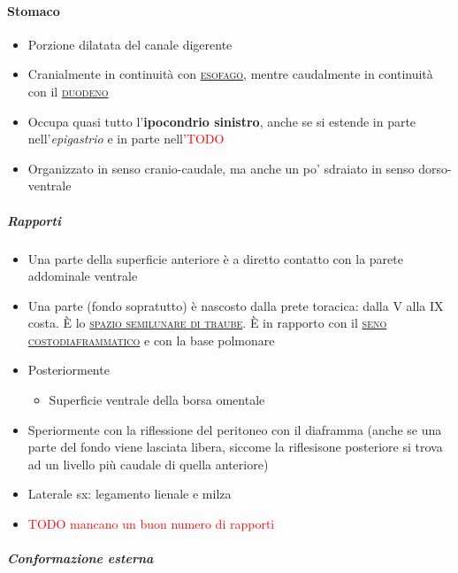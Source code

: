 \documentclass[italian,]{article}
\providecommand{\tightlist}{%
  \setlength{\itemsep}{0pt}\setlength{\parskip}{0pt}}
\renewcommand{\a}[1]{\underline{\textsc{#1}}}
\newcommand{\TODO}[1]{\textcolor{red}{\textsf{\footnotesize{TODO #1}}}} %
\begin{document}
\hypertarget{stomaco}{%
\paragraph{Stomaco}\label{stomaco}}

\begin{itemize}
\tightlist
\item
  Porzione dilatata del canale digerente
\item
  Cranialmente in continuità con \a{esofago}, mentre caudalmente in
  continuità con il \a{duodeno}
\item
  Occupa quasi tutto l'\textbf{ipocondrio sinistro}, anche se si estende
  in parte nell'\emph{epigastrio} e in parte nell'\TODO{}
\item
  Organizzato in senso cranio-caudale, ma anche un po' sdraiato in senso
  dorso-ventrale
\end{itemize}

\hypertarget{rapporti-2}{%
\subparagraph{Rapporti}\label{rapporti-2}}

\begin{itemize}
\item
  Una parte della superficie anteriore è a diretto contatto con la
  parete addominale ventrale
\item
  Una parte (fondo sopratutto) è nascosto dalla prete toracica: dalla V
  alla IX costa. È lo \a{spazio semilunare di traube}. È in rapporto con
  il \a{seno costodiaframmatico} e con la base polmonare
\item
  Posteriormente

  \begin{itemize}
  \tightlist
  \item
    Superficie ventrale della borsa omentale
  \end{itemize}
\item
  Speriormente con la riflessione del peritoneo con il diaframma (anche
  se una parte del fondo viene lasciata libera, siccome la riflesisone
  posteriore si trova ad un livello più caudale di quella anteriore)
\item
  Laterale sx: legamento lienale e milza
\item
  \TODO{mancano un buon numero di rapporti}
\end{itemize}

\hypertarget{conformazione-esterna}{%
\subparagraph{Conformazione esterna}\label{conformazione-esterna}}
\end{document}
